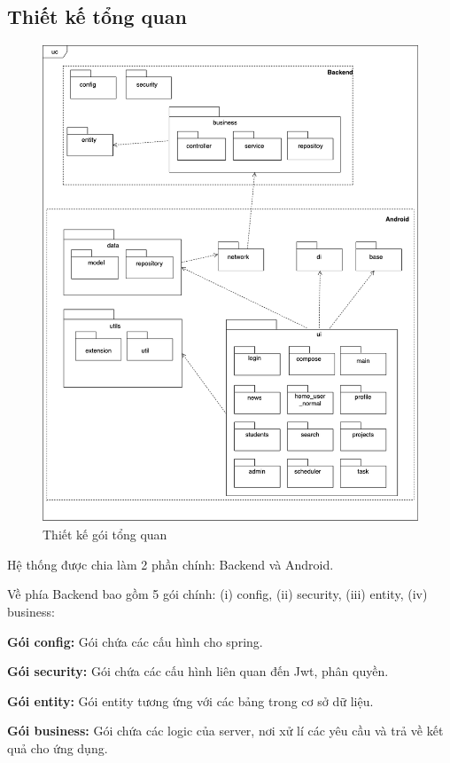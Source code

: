 \documentclass[../Main.tex]{subfiles}
\begin{document}
\subsection{Thiết kế tổng quan} 
\begin{figure}[H]
    \centering
    \includegraphics[width=0.95\linewidth]{Figure/package_diagram.png}
    \caption{Thiết kế gói tổng quan}
    \label{fig:use_case_tổng_quan}
\end{figure}
Hệ thống được chia làm 2 phần chính: Backend và Android.

Về phía Backend bao gồm 5 gói chính: (i) config, (ii) security, (iii) entity, (iv) business: 

\textbf{Gói config:} Gói chứa các cấu hình cho spring.

\textbf{Gói security:} Gói chứa các cấu hình liên quan đến Jwt, phân quyền. 

\textbf{Gói entity:} Gói entity tương ứng với các bảng trong cơ sở dữ liệu.

\textbf{Gói business:} Gói chứa các logic của server, nơi xử lí các yêu cầu và trả về kết quả cho ứng dụng.
\end{document}
